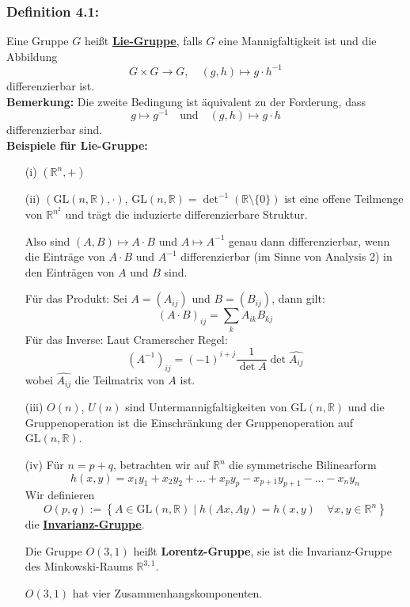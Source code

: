 \documentclass[fleqn, 12pt, letterpaper]{article}
\begin{document}
\subsubsection*{{Definition 4.1:}}
Eine Gruppe $G$ heißt \textbf{\underline{Lie-Gruppe}}, falls $G$ eine Mannigfaltigkeit ist und die Abbildung 
\[
G \times G \longrightarrow G, \quad (g, h) \longmapsto g \cdot h^{-1}
\]
differenzierbar ist.\\

\textbf{Bemerkung:}
Die zweite Bedingung ist äquivalent zu der Forderung, dass 
\[
g \longmapsto g^{-1} \quad \text{und} \quad (g, h) \longmapsto g \cdot h
\]
differenzierbar sind.\\

\textbf{Beispiele für Lie-Gruppe:}

\begin{itemize}
    \item[(i)] $(\mathbb{R}^n, +)$
    
    \item[(ii)] $(\mathrm{GL}(n, \mathbb{R}), \cdot)$, $\mathrm{GL}(n, \mathbb{R}) = \det^{-1}(\mathbb{R} \setminus \{0\})$ ist eine offene Teilmenge von $\mathbb{R}^{n^2}$ und trägt die induzierte differenzierbare Struktur.
    
    Also sind $(A, B) \mapsto A \cdot B$ und $A \mapsto A^{-1}$ genau dann differenzierbar, wenn die Einträge von $A \cdot B$ und $A^{-1}$ differenzierbar (im Sinne von Analysis 2) in den Einträgen von $A$ und $B$ sind.
    
    Für das Produkt: Sei $A = (A_{ij})$ und $B = (B_{ij})$, dann gilt: 
    \[
    (A \cdot B)_{ij} = \sum_k A_{ik} B_{kj}
    \]
    Für das Inverse: Laut Cramerscher Regel:
    \[
    (A^{-1})_{ij} = (-1)^{i+j} \frac{1}{\det A} \det \hat{A_{ij}}
    \]
    wobei $\hat{A_{ij}}$ die Teilmatrix von $A$ ist.
    
    \item[(iii)] $O(n)$, $U(n)$ sind Untermannigfaltigkeiten von $\mathrm{GL}(n, \mathbb{R})$ und die Gruppenoperation ist die Einschränkung der Gruppenoperation auf $\mathrm{GL}(n, \mathbb{R})$.


    \item[(iv)] Für $n = p + q$, betrachten wir auf $\mathbb{R}^n$ die symmetrische Bilinearform 
\[
h(x, y) = x_1y_1+x_2y_2+...+x_py_p-x_{p+1}y_{p+1}-...-x_ny_n
\]
Wir definieren 
\[
O(p, q) := \left\{A \in \mathrm{GL}(n, \mathbb{R}) \mid h(Ax, Ay) = h(x, y) \quad \forall x, y \in \mathbb{R}^n \right\}
\]
die \textbf{\underline{Invarianz-Gruppe}}.

\vspace{1em}

Die Gruppe $O(3,1)$ heißt \textbf{Lorentz-Gruppe}, sie ist die Invarianz-Gruppe des Minkowski-Raums $\mathbb{R}^{3,1}$.

\vspace{1em}

$O(3,1)$ hat vier Zusammenhangskomponenten.

\end{itemize}
\end{document}
